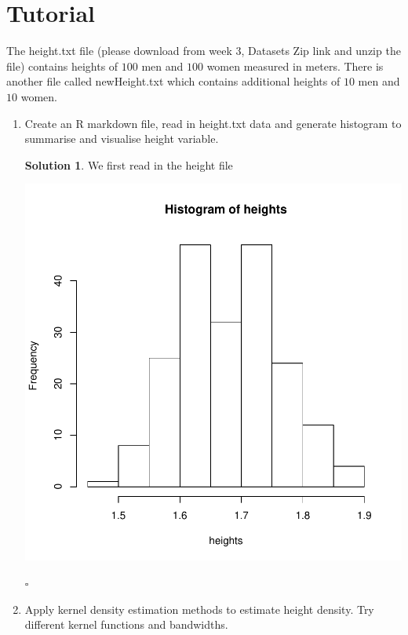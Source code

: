 \documentclass[twoside]{article}
\theoremstyle{definition}
\newtheorem*{solutionT}{Solution}
\newenvironment{solution}{\begin{cBox}\begin{solutionT}}{\hfill{\scriptsize\ensuremath{\square}}\end{solutionT}\end{cBox}}
\theoremstyle{definition}
\begin{document}
\section{Tutorial}
The height.txt file (please download from week 3, Datasets Zip link and unzip the file)
contains heights of $100$ men and $100$ women measured in meters. There is another file
called newHeight.txt which contains additional heights of $10$ men and $10$ women.

\begin{enumerate}
\item Create an R markdown file, read in height.txt data and generate histogram to
summarise and visualise height variable.
\begin{solution}
We first read in the height file
\begin{Schunk}
\end{Schunk}
\includegraphics{week3-001}

\end{solution}
\item Apply kernel density estimation methods to estimate height density. Try different
kernel functions and bandwidths.


\end{enumerate}
\end{document}
